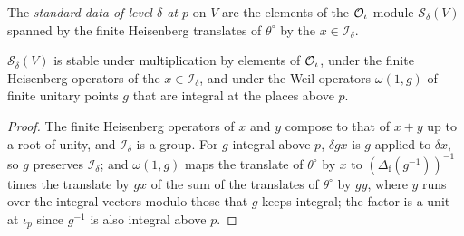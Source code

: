 \begin{definition}\label{def:standard-data}
The \emph{standard data of level $\delta$ at $p$} on $V$ are the elements of the $\mathcal{O}_\iota$-module
$\mathcal S_\delta(V)$ spanned by the finite Heisenberg translates of $\theta^\circ$ by the $x\in\mathcal I_\delta$.
\end{definition}

\begin{proposition}[Stability]\label{prop:standard-stability}
$\mathcal S_\delta(V)$ is stable under multiplication by elements of $\mathcal{O}_\iota$, under the finite
Heisenberg operators of the $x\in\mathcal I_\delta$, and under the Weil operators $\omega(1,g)$ of finite
unitary points $g$ that are integral at the places above $p$.
\end{proposition}

\begin{proof}
The finite Heisenberg operators of $x$ and $y$ compose to that of $x+y$ up to a root of unity, and
$\mathcal I_\delta$ is a group. For $g$ integral above $p$, $\delta gx$ is $g$ applied to $\delta x$, so
$g$ preserves $\mathcal I_\delta$; and $\omega(1,g)$ maps the translate of $\theta^\circ$ by $x$ to
$(\Delta_{\mathrm f}(g^{-1}))^{-1}$ times the translate by $gx$ of the sum of the translates of
$\theta^\circ$ by $gy$, where $y$ runs over the integral vectors modulo those that $g$ keeps integral; the
factor is a unit at $\iota_p$ since $g^{-1}$ is also integral above $p$.
\end{proof}


